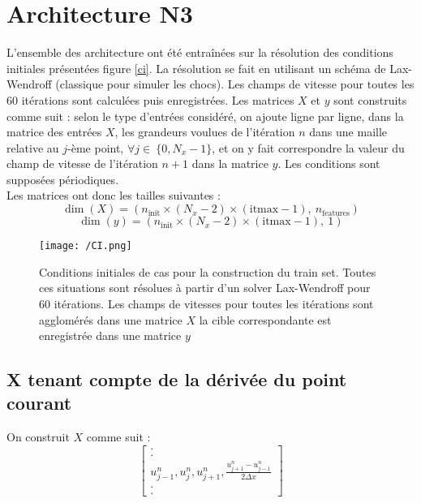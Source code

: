 \documentclass[a4paper,12pt]{report}
\numberwithin{equation}{section} %
\begin{document}
\section*{Architecture N3}
L'ensemble des architecture ont été entraînées sur la résolution des conditions initiales présentées figure \eqref{ci}. La résolution se fait en utilisant un schéma de Lax-Wendroff (classique pour simuler les chocs). Les champs de vitesse pour toutes les 60 itérations sont calculées puis enregistrées. Les matrices $X$ et $y$ sont construits comme suit : selon le type d'entrées considéré, on ajoute ligne par ligne, dans la matrice des entrées $X$, les grandeurs voulues de l'itération $n$ dans une maille relative au $j$-ème point, $\forall j \in \ \{ 0, N_x-1 \}$, et on y fait correspondre  la valeur du champ de vitesse de l'itération $n+1$ dans la matrice $y$. Les conditions sont supposées périodiques.\\
Les matrices ont donc les tailles suivantes : $$\dim\left(X \right) = (n_{\text{init}} \times (N_x - 2) \times (\text{itmax} - 1),\ n_{\text{features}}) $$
											  $$ \dim \left(y \right) = (n_{\text{init}} \times (N_x - 2) \times (\text{itmax} - 1), \ 1 ) $$

\begin{figure}[!ht]
\centering
\texttt{[image: /CI.png]}
\caption{Conditions initiales de cas pour la construction du train set. Toutes ces situations sont résolues à partir d'un solver Lax-Wendroff pour 60 itérations. Les champs de vitesses pour toutes les itérations sont agglomérés dans une matrice $X$ la cible correspondante est enregistrée dans une matrice $y$}
\label{ci}
\end{figure}

\subsection*{X tenant compte de la dérivée du point courant}
On construit $X$ comme suit : 
\begin{equation}
\left[ \begin{array}{c} 
		. \\
		. \\
		u_{j-1}^n, u_j^n, u_{j+1}^n, \frac{u_{j+1}^n - u_{j-1}^n}{2 \Delta x} \\
		. \\
		.  
	   \end{array}
\right]
\end{equation}
\end{document}
